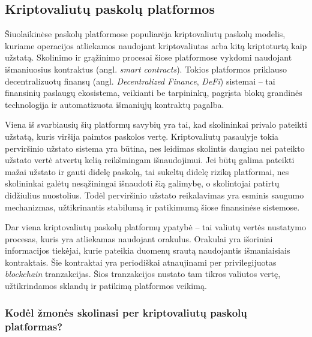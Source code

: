 \documentclass[]{VUMIFTemplateClass}
\begin{document}
\subsection{Kriptovaliutų paskolų platformos}
Šiuolaikinėse paskolų platformose populiarėja kriptovaliutų paskolų modelis, kuriame operacijos atliekamos naudojant kriptovaliutas arba kitą kriptoturtą kaip užstatą. Skolinimo ir grąžinimo procesai šiose platformose vykdomi naudojant išmaniuosius kontraktus (angl. \textit{smart contracts}). Tokios platformos priklauso decentralizuotų finansų (angl. \textit{Decentralized Finance}, \textit{DeFi}) sistemai – tai finansinių paslaugų ekosistema, veikianti be tarpininkų, pagrįsta blokų grandinės technologija ir automatizuota išmaniųjų kontraktų pagalba.

Viena iš svarbiausių šių platformų savybių yra tai, kad skolininkai privalo pateikti užstatą, kuris viršija paimtos paskolos vertę. Kriptovaliutų pasaulyje tokia perviršinio užstato sistema yra būtina, nes leidimas skolintis daugiau nei pateikto užstato vertė atvertų kelią reikšmingam išnaudojimui. Jei būtų galima pateikti mažai užstato ir gauti didelę paskolą, tai sukeltų didelę riziką platformai, nes skolininkai galėtų nesąžiningai išnaudoti šią galimybę, o skolintojai patirtų didžiulius nuostolius. Todėl perviršinio užstato reikalavimas yra esminis saugumo mechanizmas, užtikrinantis stabilumą ir patikimumą šiose finansinėse sistemose.\cite{whatisdefiliquidation}

Dar viena kriptovaliutų paskolų platformų ypatybė -- tai valiutų vertės nustatymo procesas, kuris yra atliekamas naudojant orakulus. Orakulai yra išoriniai informacijos tiekėjai, kurie pateikia duomenų srautą naudojantis išmaniaisiais kontraktais. Šie kontraktai yra periodiškai atnaujinami per privilegijuotas \textit{blockchain} tranzakcijas. Šios tranzakcijos nustato tam tikros valiutos vertę, užtikrindamos sklandų ir patikimą platformos veikimą.

\subsubsection{Kodėl žmonės skolinasi per kriptovaliutų paskolų platformas?}
\end{document}
